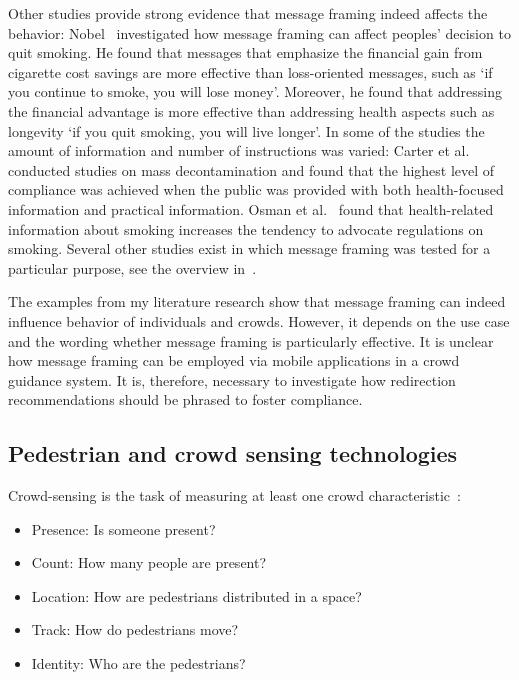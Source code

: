 Other studies provide strong evidence that message framing indeed affects the behavior: Nobel~\cite{nobel-2022-life} investigated how message framing can affect peoples' decision to quit smoking. He found that messages that emphasize the financial gain from cigarette cost savings are more effective than loss-oriented messages, such as `if you continue to smoke, you will lose money'. Moreover, he found that addressing the financial advantage is more effective than addressing health aspects such as longevity `if you quit smoking, you will live longer'.
%
In some of the studies the amount of information and number of instructions was varied: Carter et al.~\cite{carter-2014-life,carter-2015-life} conducted studies on mass decontamination and found that the highest level of compliance was achieved when the public was provided with both health-focused information and practical information.
Osman et al.~\cite{osman-2018-life} found that health-related information about smoking increases the tendency to advocate regulations on smoking.
Several other studies exist in which message framing was tested for a particular purpose, see the overview in~\cite{gallagher-2012-life}. 

The examples from my literature research show that message framing can indeed influence behavior of individuals and crowds. 
However, it depends on the use case and the wording whether message framing is particularly effective. It is unclear how message framing can be employed via mobile applications in a crowd guidance system. 
It is, therefore, necessary to investigate how redirection recommendations should be phrased to foster compliance.











\subsection{Pedestrian and crowd sensing technologies}

Crowd-sensing is the task of measuring at least one crowd characteristic~\cite{teixeira-2010-cdyn}:
\begin{itemize}
\item Presence: Is someone present?
\item Count: How many people are present? 
\item Location: How are pedestrians distributed in a space?
\item Track: How do pedestrians move?
\item Identity: Who are the pedestrians?
\end{itemize}


